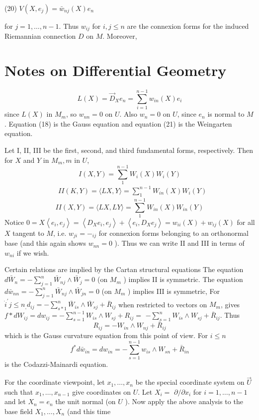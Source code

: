 \documentclass[10pt]{article}
\begin{document}
(20) $V\left(X, e_{j}\right)=\bar{w}_{n j}(X) e_{n}$

for $j=1, \ldots, n-1$. Thus $w_{i j}$ for $i, j \leq n$ are the connexion forms for the induced Riemannian connection $D$ on $M$. Moreover,

\section{Notes on Differential Geometry}
$$
L(X)=\vec{D}_{X} e_{n}=\sum_{i=1}^{n-1} w_{i n}(X) e_{i}
$$
since $L(X)$ in $M_{m}$, so $w_{n n}=0$ on $U$. Also $w_{n}=0$ on $U$, since $e_{n}$ is normal to $M$. Equation (18) is the Gauss equation and equation (21) is the Weingarten equation.

Let I, II, III be the first, second, and third fundamental forms, respectively. Then for $X$ and $Y$ in $M_{m}, m$ in $U$,
$$
I(X, Y)=\sum_{1}^{n-1} W_{i}(X) W_{i}(Y)
$$
$$
\begin{aligned}
& I I(K, Y)=\langle L X, Y\rangle=\sum_{1}^{n-1} W_{i n}(X) W_{i}(Y)
\end{aligned}
$$
$$
I I(X, Y)=\langle L X, L Y\rangle=\sum_{1}^{n-1} W_{i n}(X) W_{i n}(Y)
$$
Notice $0=X\left\langle e_{i}, e_{j}\right\rangle=\left\langle D_{X} e_{i}, e_{j}\right\rangle+\left\langle e_{i}, D_{X} e_{j}\right\rangle=w_{i i}(X)+w_{i j}(X)$ for all $X$ tangent to $M$, i.e. $w_{j i}=-_{i j}$ for connexion forms belonging to an orthonormal base (and this again shows $w_{n n}=0$ ). Thus we can write II and III in terms of $w_{n i}$ if we wish.

Certain relations are implied by the Cartan structural equations The equation $d \bar{W}_{n}=-\sum_{j=1}^{n} \bar{W}_{n j} \wedge \bar{W}_{j}=0$ (on $M_{m}$ ) implies II is symmetric. The equation $d \bar{w}_{n n}=-\sum_{j=1}^{n} \bar{W}_{n j} \wedge \bar{W}_{j n}=0$ (on $M_{m}$ ) implies III is symmetric, For $\dot{i}^{\prime} j \leq n_{,} d_{i j}=-\sum_{s * 1}^{n} \bar{W}_{i s} \wedge \bar{W}_{s j}+\bar{R}_{i j}$ when restricted to vectors on $M_{m}$, gives $f * d W_{i j}=d w_{i j}=-\sum_{s=1}^{n-1} W_{i s} \wedge W_{s j}+R_{i j}=$ $-\sum_{s=1}^{n} W_{i s} \wedge W_{s j}+\bar{R}_{i j}$. Thus
$$
R_{i j}=-W_{i n} \wedge W_{n j}+\bar{R}_{i j}
$$
which is the Gauss curvature equation from this point of view. For $i \leq n$
$$
f^{*} d \bar{w}_{i n}=d w_{i n}=-\sum_{s=1}^{n-1} w_{i s} \wedge W_{s n}+\bar{R}_{i n}
$$
is the Codazzi-Mainardi equation.

For the coordinate viewpoint, let $x_{1}, \ldots, x_{n}$ be the special coordinate system on $\vec{U}$ such that $x_{1}, \ldots, x_{n-1}$ give coordinates on $U$. Let $X_{i}=$ $\partial / \partial x_{i}$ for $i=1, \ldots, n-1$ and let $X_{n}=e_{n}$ the unit normal (on $U$ ). Now apply the above analysis to the base field $X_{1}, \ldots, X_{n}$ (and this time
\end{document}
